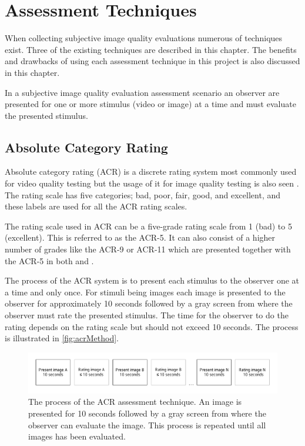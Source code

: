 \graphicspath{{Chapters/AssessmentTechniques/}}

\chapter{Assessment Techniques}

When collecting subjective image quality evaluations numerous of techniques exist. Three of the existing techniques are described in this chapter. The benefits and drawbacks of using each assessment technique in this project is also discussed in this chapter.

In a subjective image quality evaluation assessment scenario an observer are presented for one or more stimulus (video or image) at a time and must evaluate the presented stimulus. 

\section{Absolute Category Rating} %
\label{sec:acr}

Absolute category rating (ACR) is a discrete rating system most commonly used for video quality testing \cite{ITU-TRecommendationP.9102008} but the usage of it  for image quality testing is also seen \cite{Rouse2010}. The rating scale has five categories; bad, poor, fair, good, and excellent, and these labels are used for all the ACR rating scales.

The rating scale used in ACR can be a five-grade rating scale from 1 (bad) to 5 (excellent). This is referred to as the ACR-5. It can also consist of a higher number of grades like the ACR-9 or ACR-11 which are presented together with the ACR-5 in both \cite{ITU-TRecommendationP.9102008} and \cite{Rouse2010}.  

The process of the ACR system is to present each stimulus to the observer one at a time and only once. For stimuli being images each image is presented to the observer for approximately 10 seconds followed by a gray screen from where the observer must rate the presented stimulus. The time for the observer to do the rating depends on the rating scale but should not exceed 10 seconds. The process is illustrated in \autoref{fig:acrMethod}.

\begin{figure}[H]
	\centering
	\includegraphics[width = \columnwidth]{Img/ACR.pdf}
	\caption{The process of the ACR assessment technique. An image is presented for 10 seconds followed by a gray screen from where the observer can evaluate the image. This process is repeated until all images has been evaluated.}
	\label{fig:acrMethod}
\end{figure}

